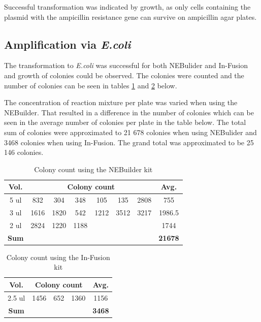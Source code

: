 \documentclass{article}
\begin{document}
\begin{multicols}{2}
	Successful transformation was indicated by growth, as only cells containing the plasmid with the ampicillin resistance gene can survive on ampicillin agar plates.
	
	\subsection{Amplification via \textit{E.coli}}	
	The transformation to \textit{E.coli} was successful for both NEBulider and In-Fusion and growth of colonies could be observed. The colonies were counted and the number of colonies can be seen in tables \ref{tab_ne} and \ref{tab_inf} below.
	
	The concentration of reaction mixture per plate was varied when using the NEBuilder. That resulted in a difference in the number of colonies which can be seen in the average number of colonies per plate in the table below. The total sum of colonies were approximated to 21 678 colonies when using NEBulider and 3468 colonies when using In-Fusion. The grand total was approximated to be 25 146 colonies.

	
	\setlength{\tabcolsep}{4pt}
	\begin{table}[H]
		\begin{center}
			\caption{Colony count using the NEBuilder kit}
			\label{tab_ne}
			
			\begin{tabular}{c|c c c c c c|c}
				\toprule
				\textbf{Vol.} & \multicolumn{6}{c|}{\textbf{Colony count}} & \textbf{Avg.} \\
				\midrule
				5 ul & 832 & 304 & 348 & 105 & 135 & 2808 & 755 \\
				3 ul & 1616 & 1820 & 542 & 1212 & 3512 & 3217 & 1986.5 \\
				2 ul & 2824 & 1220 & 1188 &  &  &  & 1744 \\ \hline
				\multicolumn{1}{c}{\textbf{Sum}} &  &  &  &  &  & \multicolumn{1}{c}{} & \multicolumn{1}{c}{\textbf{21678}} \\
			\end{tabular}
		\end{center}
	\end{table}
	\setlength{\tabcolsep}{6pt}
	
	\begin{table}[H]
		\begin{center}
			\caption{Colony count using the In-Fusion kit}
			\label{tab_inf}
		
			\begin{tabular}{c|c c c|c}
				\toprule
				\textbf{Vol.} & \multicolumn{3}{c|}{\textbf{Colony count}} & \textbf{Avg.} \\
				\midrule
				2.5 ul & 1456 & 652 & 1360 & 1156 \\ \hline
				\multicolumn{1}{c}{\textbf{Sum}} &  &  & \multicolumn{1}{c}{} & \multicolumn{1}{c}{\textbf{3468}} \\
			\end{tabular}
		\end{center}
	\end{table}	
	

\end{multicols}
\end{document}
